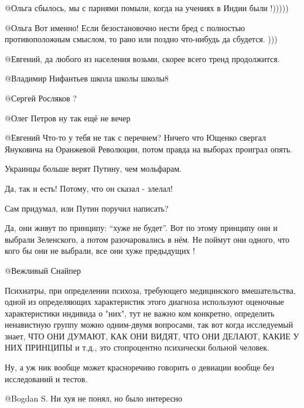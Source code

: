 \begin{itemize}
\begin{itemize}
 @Ольга  сбылось, мы с парнями помыли, когда на учениях в Индии были !)))))



@Ольга  Вот именно! Если безостановочно нести бред с полностью противоположным
смыслом, то рано или поздно что-нибудь да сбудется.   )))



 @Евгений, да любого из населения возьми, скорее всего тренд продолжится.


 @Владимир Нифантьев  школа школы школы8

 @Сергей Росляков  ?

 @Олег Петров  ну так ещё не вечер

 @Евгений  Что-то у тебя не так с перечнем? Ничего что Ющенко свергал Януковича на Оранжевой Революции, потом правда на выборах проиграл опять.

\end{itemize} %

Украинцы больше верят Путину, чем мольфарам.

\begin{itemize} %
Да, так и есть! Потому, что он сказал - злелал!


Сам придумал, или Путин поручил написать?


Да, они живут по принципу: \enquote{хуже не будет}. Вот по этому принципу они и
выбрали Зеленского, а потом разочаровались в нём. Не поймут они одного, что
кого бы они не выбрали, все они хуже предыдущих !


@Вежливый Снайпер  

Психиатры, при определении психоза, требующего медицинского вмешательства,
одной из определяющих характеристик этого диагноза используют оценочные
характеристики индивида о "них", тут не важно ком конкретно, определить
ненавистную группу можно одним-двумя вопросами, так вот когда исследуемый
знает, ЧТО ОНИ ДУМАЮТ, КАК ОНИ ВИДЯТ, ЧТО ОНИ ДЕЛАЮТ, КАКИЕ У НИХ ПРИНЦИПЫ и
т.д., это стопроцентно психически больной человек.

Ну, а уж ник вообще может красноречиво говорить о девиации вообще без исследований и тестов.

 @Bogdan S.  Ни хуя не понял, но было интересно


\end{itemize}
\end{itemize}
